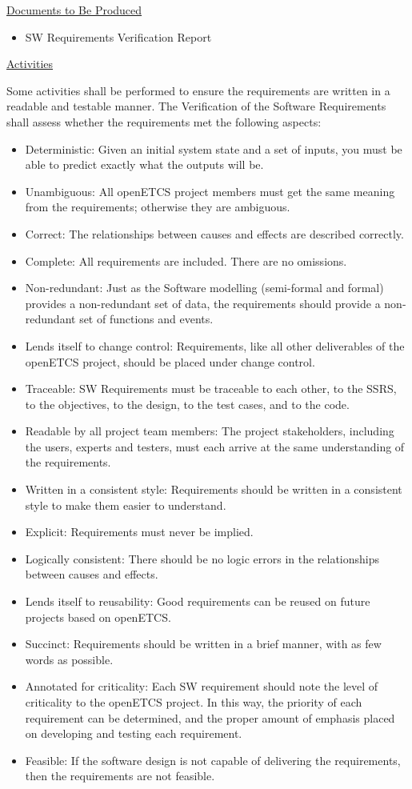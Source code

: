 \underline{Documents to Be Produced} 

\begin{itemize}
\item SW Requirements Verification Report
\end{itemize}

\underline{Activities}

Some activities shall be performed to ensure the requirements are
written in a readable and testable manner. The Verification of the
Software Requirements shall assess whether the requirements met the
following aspects:
\begin{itemize}
\item Deterministic: Given an initial system state and a set of
  inputs, you must be able to predict exactly what the outputs will
  be.
\item Unambiguous: All openETCS project members must get the same
  meaning from the requirements; otherwise they are ambiguous.
\item Correct: The relationships between causes and effects are
  described correctly.
\item Complete: All requirements are included. There are no omissions.
\item Non-redundant: Just as the Software modelling (semi-formal and
  formal) provides a non-redundant set of data, the requirements
  should provide a non-redundant set of functions and events.
\item Lends itself to change control: Requirements, like all other
  deliverables of the openETCS project, should be placed under change
  control.
\item Traceable: SW Requirements must be traceable to each other, to
  the SSRS, to the objectives, to the design, to the test cases, and
  to the code.
\item Readable by all project team members: The project stakeholders,
  including the users, experts and testers, must each arrive at the
  same understanding of the requirements.
\item Written in a consistent style: Requirements should be written in
  a consistent style to make them easier to understand.
\item Explicit: Requirements must never be implied.
\item Logically consistent: There should be no logic errors in the
  relationships between causes and effects.
\item Lends itself to reusability: Good requirements can be reused on
  future projects based on openETCS.
\item Succinct: Requirements should be written in a brief manner, with
  as few words as possible.
\item Annotated for criticality: Each SW requirement should note the
  level of criticality to the openETCS project. In this way, the
  priority of each requirement can be determined, and the proper
  amount of emphasis placed on developing and testing each
  requirement.
\item Feasible: If the software design is not capable of delivering
  the requirements, then the requirements are not feasible.
\end{itemize}

